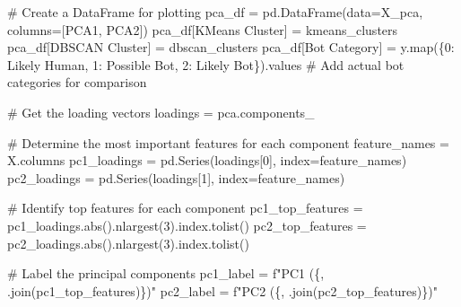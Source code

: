\documentclass[
  12pt,
  letterpaper,
  DIV=11,
  numbers=noendperiod]{scrartcl}
\newenvironment{Shaded}{\begin{snugshade}}{\end{snugshade}}
\newcommand{\BuiltInTok}[1]{\textcolor[rgb]{0.00,0.23,0.31}{#1}}
\newcommand{\CommentTok}[1]{\textcolor[rgb]{0.37,0.37,0.37}{#1}}
\newcommand{\DecValTok}[1]{\textcolor[rgb]{0.68,0.00,0.00}{#1}}
\newcommand{\NormalTok}[1]{\textcolor[rgb]{0.00,0.23,0.31}{#1}}
\newcommand{\OperatorTok}[1]{\textcolor[rgb]{0.37,0.37,0.37}{#1}}
\newcommand{\SpecialCharTok}[1]{\textcolor[rgb]{0.37,0.37,0.37}{#1}}
\newcommand{\SpecialStringTok}[1]{\textcolor[rgb]{0.13,0.47,0.30}{#1}}
\newcommand{\StringTok}[1]{\textcolor[rgb]{0.13,0.47,0.30}{#1}}
\begin{document}
\begin{Shaded}
\begin{Highlighting}[]
\CommentTok{\# Create a DataFrame for plotting}
\NormalTok{pca\_df }\OperatorTok{=}\NormalTok{ pd.DataFrame(data}\OperatorTok{=}\NormalTok{X\_pca, columns}\OperatorTok{=}\NormalTok{[}\StringTok{\textquotesingle{}PCA1\textquotesingle{}}\NormalTok{, }\StringTok{\textquotesingle{}PCA2\textquotesingle{}}\NormalTok{])}
\NormalTok{pca\_df[}\StringTok{\textquotesingle{}KMeans Cluster\textquotesingle{}}\NormalTok{] }\OperatorTok{=}\NormalTok{ kmeans\_clusters}
\NormalTok{pca\_df[}\StringTok{\textquotesingle{}DBSCAN Cluster\textquotesingle{}}\NormalTok{] }\OperatorTok{=}\NormalTok{ dbscan\_clusters}
\NormalTok{pca\_df[}\StringTok{\textquotesingle{}Bot Category\textquotesingle{}}\NormalTok{] }\OperatorTok{=}\NormalTok{ y.}\BuiltInTok{map}\NormalTok{(\{}\DecValTok{0}\NormalTok{: }\StringTok{\textquotesingle{}Likely Human\textquotesingle{}}\NormalTok{, }\DecValTok{1}\NormalTok{: }\StringTok{\textquotesingle{}Possible Bot\textquotesingle{}}\NormalTok{, }\DecValTok{2}\NormalTok{: }\StringTok{\textquotesingle{}Likely Bot\textquotesingle{}}\NormalTok{\}).values  }\CommentTok{\# Add actual bot categories for comparison}

\CommentTok{\# Get the loading vectors}
\NormalTok{loadings }\OperatorTok{=}\NormalTok{ pca.components\_}

\CommentTok{\# Determine the most important features for each component}
\NormalTok{feature\_names }\OperatorTok{=}\NormalTok{ X.columns}
\NormalTok{pc1\_loadings }\OperatorTok{=}\NormalTok{ pd.Series(loadings[}\DecValTok{0}\NormalTok{], index}\OperatorTok{=}\NormalTok{feature\_names)}
\NormalTok{pc2\_loadings }\OperatorTok{=}\NormalTok{ pd.Series(loadings[}\DecValTok{1}\NormalTok{], index}\OperatorTok{=}\NormalTok{feature\_names)}

\CommentTok{\# Identify top features for each component}
\NormalTok{pc1\_top\_features }\OperatorTok{=}\NormalTok{ pc1\_loadings.}\BuiltInTok{abs}\NormalTok{().nlargest(}\DecValTok{3}\NormalTok{).index.tolist()}
\NormalTok{pc2\_top\_features }\OperatorTok{=}\NormalTok{ pc2\_loadings.}\BuiltInTok{abs}\NormalTok{().nlargest(}\DecValTok{3}\NormalTok{).index.tolist()}

\CommentTok{\# Label the principal components}
\NormalTok{pc1\_label }\OperatorTok{=} \SpecialStringTok{f"PC1 (}\SpecialCharTok{\{}\StringTok{\textquotesingle{}, \textquotesingle{}}\SpecialCharTok{.}\NormalTok{join(pc1\_top\_features)}\SpecialCharTok{\}}\SpecialStringTok{)"}
\NormalTok{pc2\_label }\OperatorTok{=} \SpecialStringTok{f"PC2 (}\SpecialCharTok{\{}\StringTok{\textquotesingle{}, \textquotesingle{}}\SpecialCharTok{.}\NormalTok{join(pc2\_top\_features)}\SpecialCharTok{\}}\SpecialStringTok{)"}
\end{Highlighting}
\end{Shaded}
\end{document}
